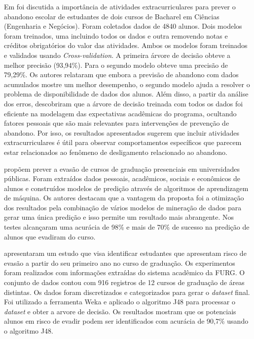 \documentclass[diss,capa]{texufpel}
\begin{document}
    Em \citealp{hasbun2016extracurricular} foi discutida a importância de atividades extracurriculares para prever o abandono escolar de estudantes de dois cursos de Bacharel em Ciências (Engenharia e Negócios).
    Foram coletados dados de 4840 alunos.
    Dois modelos foram treinados, uma incluindo todos os dados e outra removendo notas e créditos obrigatórios do valor das atividades.
    Ambos os modelos foram treinados e validados usando \textit{Cross-validation}.
    A primeira árvore de decisão obteve a melhor precisão (93,94\%).
    Para o segundo modelo obteve uma precisão de 79,29\%.
    Os autores relataram que embora a previsão de abandono com dados acumulados mostre um melhor desempenho, o segundo modelo ajuda a resolver o problema de disponibilidade de dados dos alunos.
    Além disso, a partir da análise dos erros, descobriram que a árvore de decisão treinada com todos os dados foi eficiente na modelagem das expectativas acadêmicas do programa, ocultando fatores pessoais que são mais relevantes para intervenções de prevenção de abandono.
    Por isso, os resultados apresentados sugerem que incluir atividades extracurriculares é útil para observar comportamentos específicos que parecem estar relacionados ao fenômeno de desligamento relacionado ao abandono.

    \citealp{kantorski2016prediccao} propõem prever a evasão de cursos de graduação presenciais em universidades públicas.
    Foram extraídos dados pessoais, acadêmicos, sociais e econômicos de alunos e construídos modelos de predição através de algoritmos de aprendizagem de máquina.
    Os autores destacam que a vantagem da proposta foi a otimização dos resultados pela combinação de vários modelos de mineração de dados para gerar uma única predição e isso permite um resultado mais abrangente.
    Nos testes alcançaram uma acurácia de 98\% e mais de 70\% de sucesso na predição de alunos que evadiram do curso.


    \citealp{lanes2018prediccao} apresentaram um estudo que visa identificar estudantes que apresentam risco de evasão a partir do seu primeiro ano no curso de graduação.
    Os experimentos foram realizados com informações extraídas do sistema acadêmico da FURG.
    O conjunto de dados contou com 916 registros de 12 cursos de graduação de áreas distintas.
    Os dados foram discretizados e categorizados para gerar o \textit{dataset} final.
    Foi utilizado a ferramenta Weka e aplicado o algoritmo J48 para processar o \textit{dataset} e obter a arvore de decisão.
    Os resultados mostram que os potenciais alunos em risco de evadir podem ser identificados com acurácia de 90,7\% usando o algoritmo J48.
\end{document}
